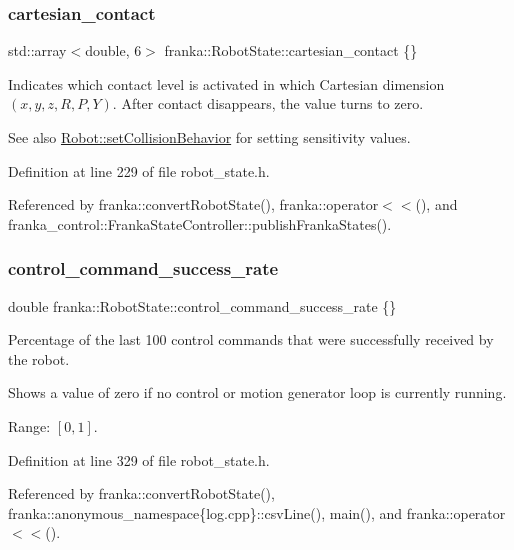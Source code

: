 \subsubsection{\texorpdfstring{cartesian\+\_\+contact}{cartesian\_contact}}
{\footnotesize\ttfamily std\+::array$<$double, 6$>$ franka\+::\+Robot\+State\+::cartesian\+\_\+contact \{\}}

Indicates which contact level is activated in which Cartesian dimension $(x,y,z,R,P,Y)$. After contact disappears, the value turns to zero.

\begin{DoxySeeAlso}{See also}
\hyperlink{classfranka_1_1Robot_a168e1214ac36d74ac64f894332b84534}{Robot\+::set\+Collision\+Behavior} for setting sensitivity values. 
\end{DoxySeeAlso}


Definition at line 229 of file robot\+\_\+state.\+h.



Referenced by franka\+::convert\+Robot\+State(), franka\+::operator$<$$<$(), and franka\+\_\+control\+::\+Franka\+State\+Controller\+::publish\+Franka\+States().

\mbox{\label{structfranka_1_1RobotState_af208572613a6afcdc61a24970c71fa28}} 
\subsubsection{\texorpdfstring{control\+\_\+command\+\_\+success\+\_\+rate}{control\_command\_success\_rate}}
{\footnotesize\ttfamily double franka\+::\+Robot\+State\+::control\+\_\+command\+\_\+success\+\_\+rate \{\}}

Percentage of the last 100 control commands that were successfully received by the robot.

Shows a value of zero if no control or motion generator loop is currently running.

Range\+: $[0, 1]$. 

Definition at line 329 of file robot\+\_\+state.\+h.



Referenced by franka\+::convert\+Robot\+State(), franka\+::anonymous\+\_\+namespace\{log.\+cpp\}\+::csv\+Line(), main(), and franka\+::operator$<$$<$().

